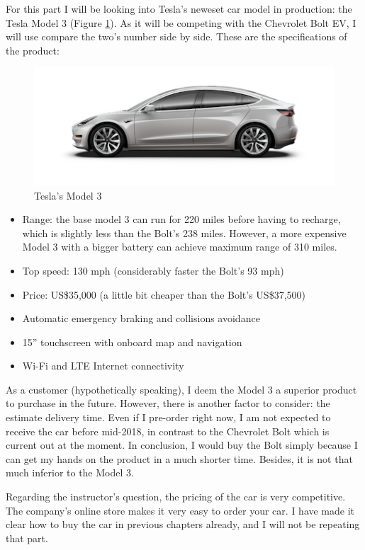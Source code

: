 \documentclass[12pt]{article}
\begin{document}
For this part I will be looking into Tesla's neweset car model in production: the Tesla Model 3 (Figure \ref{model3pic}). As it will be competing with the Chevrolet Bolt EV, I will use compare the two's number side by side. These are the specifications of the product:

\begin{figure}
	\includegraphics[width=\textwidth]{model_3--side_profile.png}
	\caption{Tesla's Model 3\label{model3pic}}
\end{figure}

\begin{itemize}
	\item{Range: the base model 3 can run for 220 miles before having to recharge, which is slightly less than the Bolt's 238 miles. However, a more expensive Model 3 with a bigger battery can achieve maximum range of 310 miles.}
	\item{Top speed: 130 mph (considerably faster the Bolt's 93 mph)}
	\item{Price: US\$35,000 (a little bit cheaper than the Bolt's US\$37,500)}
	\item{Automatic emergency braking and collisions avoidance}
	\item{15'' touchscreen with onboard map and navigation}
	\item{Wi-Fi and LTE Internet connectivity}
\end{itemize}

As a customer (hypothetically speaking), I deem the Model 3 a superior product to purchase in the future. However, there is another factor to consider: the estimate delivery time. Even if I pre-order right now, I am not expected to receive the car before mid-2018, in contrast to the Chevrolet Bolt which is current out at the moment. In conclusion, I would buy the Bolt simply because I can get my hands on the product in a much shorter time. Besides, it is not that much inferior to the Model 3.

Regarding the instructor's question, the pricing of the car is very competitive. The company's online store makes it very easy to order your car. I have made it clear how to buy the car in previous chapters already, and I will not be repeating that part.
\end{document}
